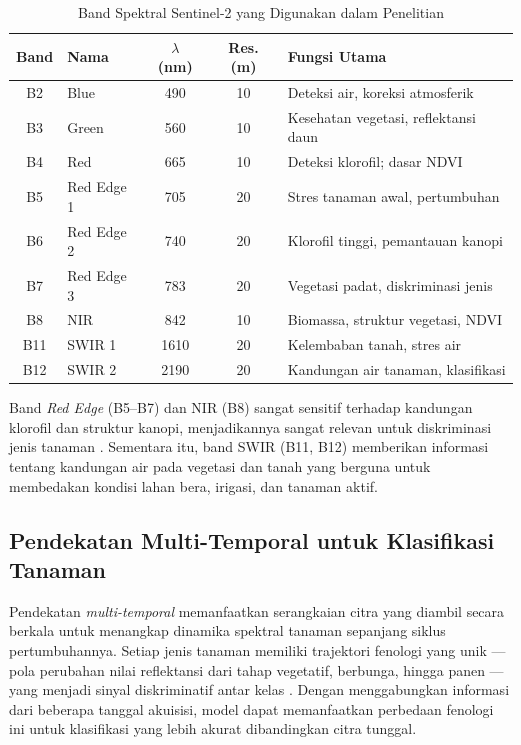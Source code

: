 \begin{table}[H]
    \centering
    \caption{Band Spektral Sentinel-2 yang Digunakan dalam Penelitian}
    \label{tab:band_sentinel}
    \begin{tabular}{|c|l|c|c|l|}
    \hline
    \textbf{Band} & \textbf{Nama} & \textbf{$\lambda$ (nm)} & \textbf{Res. (m)} & \textbf{Fungsi Utama} \\ \hline
    B2 & Blue & 490 & 10 & Deteksi air, koreksi atmosferik \\ \hline
    B3 & Green & 560 & 10 & Kesehatan vegetasi, reflektansi daun \\ \hline
    B4 & Red & 665 & 10 & Deteksi klorofil; dasar NDVI \\ \hline
    B5 & Red Edge 1 & 705 & 20 & Stres tanaman awal, pertumbuhan \\ \hline
    B6 & Red Edge 2 & 740 & 20 & Klorofil tinggi, pemantauan kanopi \\ \hline
    B7 & Red Edge 3 & 783 & 20 & Vegetasi padat, diskriminasi jenis \\ \hline
    B8 & NIR & 842 & 10 & Biomassa, struktur vegetasi, NDVI \\ \hline
    B11 & SWIR 1 & 1610 & 20 & Kelembaban tanah, stres air \\ \hline
    B12 & SWIR 2 & 2190 & 20 & Kandungan air tanaman, klasifikasi \\ \hline
    \end{tabular}
\end{table}

Band \textit{Red Edge} (B5--B7) dan NIR (B8) sangat sensitif terhadap kandungan klorofil dan struktur kanopi, menjadikannya sangat relevan untuk diskriminasi jenis tanaman \citep{yi2020}.
Sementara itu, band SWIR (B11, B12) memberikan informasi tentang kandungan air pada vegetasi dan tanah yang berguna untuk membedakan kondisi lahan bera, irigasi, dan tanaman aktif.

\subsection{Pendekatan Multi-Temporal untuk Klasifikasi Tanaman}
Pendekatan \textit{multi-temporal} memanfaatkan serangkaian citra yang diambil secara berkala untuk menangkap dinamika spektral tanaman sepanjang siklus pertumbuhannya.
Setiap jenis tanaman memiliki trajektori fenologi yang unik — pola perubahan nilai reflektansi dari tahap vegetatif, berbunga, hingga panen — yang menjadi sinyal diskriminatif antar kelas \citep{li2023agri}.
Dengan menggabungkan informasi dari beberapa tanggal akuisisi, model dapat memanfaatkan perbedaan fenologi ini untuk klasifikasi yang lebih akurat dibandingkan citra tunggal.

